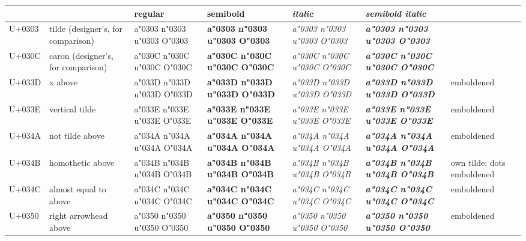 \documentclass[landscape]{article}
\begin{document}
\begingroup
\LibertinusSerifPatch
\renewcommand{\arraystretch}{1.9}
\begin{tabular}{@{}l>{\footnotesize}p{38mm}>{\Large}l>{\Large\bfseries}l>{\Large\itshape}l>{\Large\bfseries\itshape}l>{\footnotesize}p{38mm}@{}}
	& & \normalsize\normalfont regular & \normalsize\normalfont semibold & \normalsize\normalfont italic & \normalsize\normalfont semibold italic & \\
	\hline
	{\footnotesize U+0303} & tilde (designer's, for comparison) & a\char"0303 n\char"0303 u\char"0303 O\char"0303 & a\char"0303 n\char"0303 u\char"0303 O\char"0303 & a\char"0303 n\char"0303 u\char"0303 O\char"0303 & a\char"0303 n\char"0303 u\char"0303 O\char"0303 &  \\
	{\footnotesize U+030C} & caron (designer's, for comparison) & a\char"030C n\char"030C u\char"030C O\char"030C & a\char"030C n\char"030C u\char"030C O\char"030C & a\char"030C n\char"030C u\char"030C O\char"030C & a\char"030C n\char"030C u\char"030C O\char"030C &  \\
	\hline
	{\footnotesize U+033D} & x above & a\char"033D n\char"033D u\char"033D O\char"033D & a\char"033D n\char"033D u\char"033D O\char"033D & a\char"033D n\char"033D u\char"033D O\char"033D & a\char"033D n\char"033D u\char"033D O\char"033D & emboldened \\
	{\footnotesize U+033E} & vertical tilde & a\char"033E n\char"033E u\char"033E O\char"033E & a\char"033E n\char"033E u\char"033E O\char"033E & a\char"033E n\char"033E u\char"033E O\char"033E & a\char"033E n\char"033E u\char"033E O\char"033E & emboldened \\
	{\footnotesize U+034A} & not tilde above & a\char"034A n\char"034A u\char"034A O\char"034A & a\char"034A n\char"034A u\char"034A O\char"034A & a\char"034A n\char"034A u\char"034A O\char"034A & a\char"034A n\char"034A u\char"034A O\char"034A & emboldened \\
	{\footnotesize U+034B} & homothetic above & a\char"034B n\char"034B u\char"034B O\char"034B & a\char"034B n\char"034B u\char"034B O\char"034B & a\char"034B n\char"034B u\char"034B O\char"034B & a\char"034B n\char"034B u\char"034B O\char"034B & own tilde; dots emboldened \\
	{\footnotesize U+034C} & almost equal to above & a\char"034C n\char"034C u\char"034C O\char"034C & a\char"034C n\char"034C u\char"034C O\char"034C & a\char"034C n\char"034C u\char"034C O\char"034C & a\char"034C n\char"034C u\char"034C O\char"034C & emboldened \\
	{\footnotesize U+0350} & right arrowhead above & a\char"0350 n\char"0350 u\char"0350 O\char"0350 & a\char"0350 n\char"0350 u\char"0350 O\char"0350 & a\char"0350 n\char"0350 u\char"0350 O\char"0350 & a\char"0350 n\char"0350 u\char"0350 O\char"0350 & emboldened \\

\end{tabular}
\end{document}

